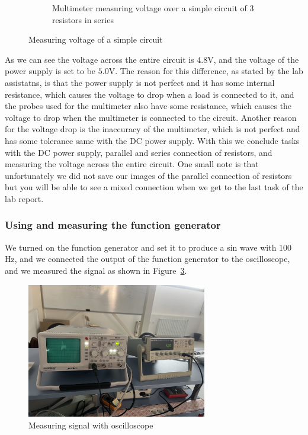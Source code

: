 \documentclass[a4paper, 10pt]{article}
\newcommand{\figref}[1]{Figure~\ref{#1}}
\begin{document}
\begin{figure}[h]
\begin{subfigure}[h]{0.65\textwidth}
								\caption{Multimeter measuring voltage over a simple circuit of 3 resistors in series}
								\label{sub-fig:MeasuringVoltageOfASimpleCircuit}
							\end{subfigure}

							\caption{Measuring voltage of a simple circuit}
							\label{fig:MeasuringVoltageOfACircuit}
					\end{figure}

					As we can see the voltage across the entire circuit is $4.8\text{V}$, and the voltage of the power supply is set to be $5.0\text{V}$. The reason for this difference, as stated by the
					lab assistatns, is that the power supply is not perfect and it has some internal resistance, which causes the voltage to drop when a load is connected to it, and the 
					probes used for the multimeter also have some resistance, which causes the voltage to drop when the multimeter is connected to the circuit. Another reason for the voltage drop is the
					inaccuracy of the multimeter, which is not perfect and has some tolerance same with the DC power supply. With this we conclude tasks with the DC power supply, parallel and series connection
					of resistors, and measuring the voltage across the entire circuit. One small note is that unfortunately we did not save our images of the parallel connection of resistors but you will be
					able to see a mixed connection when we get to the last task of the lab report.
				
				\pagebreak
				\subsubsection{Using and measuring the function generator}
					We turned on the function generator and set it to produce a sin wave with 100 Hz, and we connected the output of the function generator to the oscilloscope, and we measured the signal as shown in \figref{fig:MeasuringSignalWithOscilloscope}.
					\begin{figure}[h!]
						\centering
						\includegraphics[width=0.7\textwidth]{./images/MeasuringSignalWithOscilloscope.jpeg}
						\caption{Measuring signal with oscilloscope}
						\label{fig:MeasuringSignalWithOscilloscope}
					\end{figure}
\end{document}
